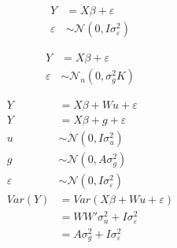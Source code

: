 \documentclass[11pt]{article}
\begin{document}
\begin{align*}
Y &= X \beta + \varepsilon\\
\varepsilon &\sim \mathcal{N}\left(0, I\sigma^2_{\varepsilon} \right)
\end{align*}


\begin{align*}
Y &= X \beta + \varepsilon\\
\varepsilon &\sim \mathcal{N}_n(0, \sigma^2_g K)
\end{align*}

\begin{align*}
Y &= X \beta + W u + \varepsilon\\
Y &= X \beta + g + \varepsilon\\
u & \sim \mathcal{N}\left(0, I\sigma_u^2\right)\\
g &\sim \mathcal{N}\left(0, A \sigma_g^2\right)\\
\varepsilon & \sim \mathcal{N}\left(0, I \sigma_{\varepsilon}^2\right)\\
Var(Y) &= Var(X \beta + Wu + \varepsilon)\\
&=  WW' \sigma_u^2 + I \sigma_{\varepsilon}^2\\
&= A \sigma_{g}^2 + I \sigma_{\varepsilon}^2
\end{align*}
\end{document}
